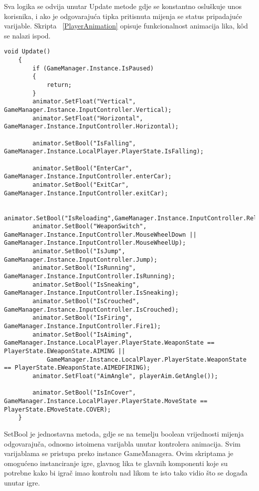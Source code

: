 Sva logika se odvija unutar Update metode gdje se konstantno osluškuje unos korisnika, i ako je odgovarajuća tipka pritisnuta mijenja se status pripadajuće varijable. 
Skripta ~\ref{PlayerAnimation} opisuje funkcionalnost animacija lika, k\^od se nalazi ispod.
\begin{lstlisting}[caption={Animacije lika}, label=PlayerAnimation]
 void Update()
    {
        if (GameManager.Instance.IsPaused)
        {
            return;
        }
        animator.SetFloat("Vertical", GameManager.Instance.InputController.Vertical);
        animator.SetFloat("Horizontal", GameManager.Instance.InputController.Horizontal);

        animator.SetBool("IsFalling", GameManager.Instance.LocalPlayer.PlayerState.IsFalling);

        animator.SetBool("EnterCar", GameManager.Instance.InputController.enterCar);
        animator.SetBool("ExitCar", GameManager.Instance.InputController.exitCar);

        animator.SetBool("IsReloading",GameManager.Instance.InputController.Reload);
        animator.SetBool("WeaponSwitch", GameManager.Instance.InputController.MouseWheelDown || GameManager.Instance.InputController.MouseWheelUp);
        animator.SetBool("IsJump", GameManager.Instance.InputController.Jump);
        animator.SetBool("IsRunning", GameManager.Instance.InputController.IsRunning);
        animator.SetBool("IsSneaking", GameManager.Instance.InputController.IsSneaking);
        animator.SetBool("IsCrouched", GameManager.Instance.InputController.IsCrouched);
        animator.SetBool("IsFiring", GameManager.Instance.InputController.Fire1);
        animator.SetBool("IsAiming", GameManager.Instance.LocalPlayer.PlayerState.WeaponState == PlayerState.EWeaponState.AIMING ||
            GameManager.Instance.LocalPlayer.PlayerState.WeaponState == PlayerState.EWeaponState.AIMEDFIRING);
        animator.SetFloat("AimAngle", playerAim.GetAngle());

        animator.SetBool("IsInCover", GameManager.Instance.LocalPlayer.PlayerState.MoveState == PlayerState.EMoveState.COVER);
    }
\end{lstlisting}
SetBool je jednostavna metoda, gdje se na temelju boolean vrijednosti mijenja odgovarajuča, odnosno istoimena varijabla unutar kontrolera animacija. Svim varijablama se pristupa preko instance GameManagera.
Ovim skriptama je omogućeno instanciranje igre, glavnog lika te glavnih komponenti koje su potrebne kako bi igrač imao kontrolu nad likom te isto tako vidio što se događa unutar igre.
